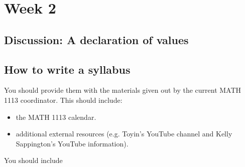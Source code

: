 
\section{Week 2}
\label{sec:week-2}

\subsection{Discussion: A declaration of values}
\label{sec:disc-decl-valu}

\subsection{How to write a syllabus}
\label{sec:how-write-syllabus}

You should provide them with the materials given out by the current MATH 1113 coordinator.  This should include:
\begin{itemize}
\item the MATH 1113 calendar.
\item additional external resources (e.g. Toyin's YouTube channel and Kelly Sappington's YouTube information).
\end{itemize}

You should include 
